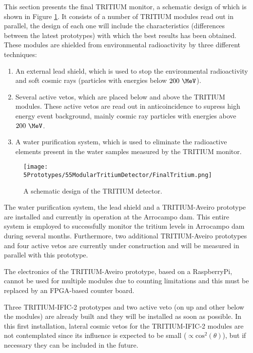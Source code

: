 This section presents the final TRITIUM monitor, a schematic design of which is shown in Figure \ref{fig:TritiumDetectorSchematicDesign}. It consists of a number of TRITIUM modules read out in parallel, the design of each one will include the characteristics (differences between the latest prototypes) with which the best results has been obtained. These modules are shielded from environmental radioactivity by three different techniques:

\begin{enumerate}

\item{} An external lead shield, which is used to stop the environmental radioactivity and soft cosmic rays (particles with energies below $200~\MeV$).

\item{} Several active vetos, which are placed below and above the TRITIUM modules. These active vetos are read out in anticoincidence to supress high energy event background, mainly cosmic ray particles with energies above $200~\MeV$.

\item{} A water purification system, which is used to eliminate the radioactive elements present in the water samples measured by the TRITIUM monitor.

\end{enumerate}

\begin{figure}[h]
\centering
\texttt{[image: 5Prototypes/55ModularTritiumDetector/FinalTritium.png]}
\caption{A schematic design of the TRITIUM detector.\label{fig:TritiumDetectorSchematicDesign}}
\end{figure}

The water purification system, the lead shield and a TRITIUM-Aveiro prototype are installed and currently in operation at the Arrocampo dam. This entire system is employed to successfully monitor the tritium levels in Arrocampo dam during several months. Furthermore, two additional TRITIUM-Aveiro prototypes and four active vetos are currently under construction and will be measured in parallel with this prototype.

The electronics of the TRITIUM-Aveiro prototype, based on a RaspberryPi, cannot be used for multiple modules due to counting limitations and this must be replaced by an FPGA-based counter board.

Three TRITIUM-IFIC-2 prototypes and two active veto (on up and other below the modules) are already built and they will be installed as soon as possible. In this first installation, lateral cosmic vetos for the TRITIUM-IFIC-2 modules are not contemplated since its influence is expected to be small ($\propto \text{cos}^2(\theta)$), but if necessary they can be included in the future.

